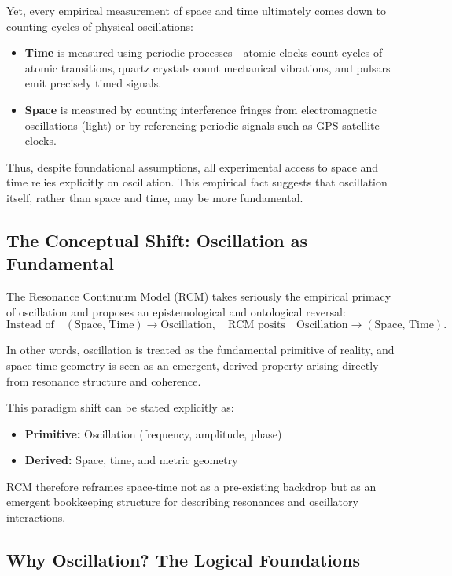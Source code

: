 Yet, every empirical measurement of space and time ultimately comes down to counting cycles of physical oscillations:
\begin{itemize}
    \item \textbf{Time} is measured using periodic processes—atomic clocks count cycles of atomic transitions, quartz crystals count mechanical vibrations, and pulsars emit precisely timed signals.
    \item \textbf{Space} is measured by counting interference fringes from electromagnetic oscillations (light) or by referencing periodic signals such as GPS satellite clocks.
\end{itemize}

Thus, despite foundational assumptions, all experimental access to space and time relies explicitly on oscillation. This empirical fact suggests that oscillation itself, rather than space and time, may be more fundamental.

\subsection{The Conceptual Shift: Oscillation as Fundamental}

The Resonance Continuum Model (RCM) takes seriously the empirical primacy of oscillation and proposes an epistemological and ontological reversal:
\begin{equation}
    \text{Instead of}\quad(\text{Space, Time}) \rightarrow \text{Oscillation},\quad\text{RCM posits}\quad\text{Oscillation}\rightarrow(\text{Space, Time}).
\end{equation}

In other words, oscillation is treated as the fundamental primitive of reality, and space-time geometry is seen as an emergent, derived property arising directly from resonance structure and coherence.

This paradigm shift can be stated explicitly as:
\begin{itemize}
    \item \textbf{Primitive:} Oscillation (frequency, amplitude, phase)
    \item \textbf{Derived:} Space, time, and metric geometry
\end{itemize}

RCM therefore reframes space-time not as a pre-existing backdrop but as an emergent bookkeeping structure for describing resonances and oscillatory interactions.

\subsection{Why Oscillation? The Logical Foundations}

